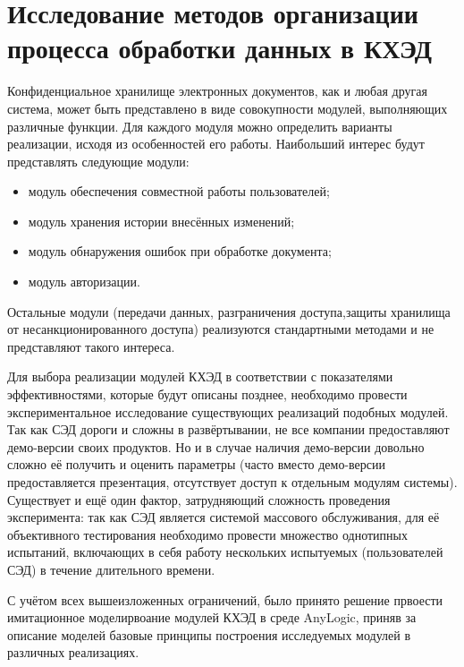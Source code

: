 \section{Исследование методов организации процесса обработки данных в КХЭД} \label{experiment}

Конфиденциальное хранилище электронных документов, как и любая другая система, может быть представлено в виде совокупности модулей, выполняющих различные функции. %
Для каждого модуля можно определить варианты реализации, исходя из особенностей его работы. Наибольший интерес будут представлять следующие модули:
\begin{itemize}
	\item модуль обеспечения совместной работы пользователей;
	\item модуль хранения истории внесённых изменений;
	\item модуль обнаружения ошибок при обработке документа;
	\item модуль авторизации.
\end{itemize}
Остальные модули (передачи данных, разграничения доступа,защиты хранилища от несанкционированного доступа) реализуются стандартными методами и не представляют такого интереса.

\vspace{\baselineskip}
Для выбора реализации модулей КХЭД в соответствии с показателями эффективностями, которые будут описаны позднее, необходимо провести экспериментальное исследование существующих реализаций подобных модулей. Так как СЭД дороги и сложны в развёртывании, не все компании предоставляют демо-версии своих продуктов. Но и в случае наличия демо-версии довольно сложно её получить и оценить параметры (часто вместо демо-версии предоставляется презентация, отсутствует доступ к отдельным модулям системы). Существует и ещё один фактор, затрудняющий сложность проведения эксперимента: так как СЭД является системой массового обслуживания, для её объективного тестирования необходимо провести множество однотипных испытаний, включающих в себя работу нескольких испытуемых (пользователей СЭД) в течение длительного времени.

\vspace{\baselineskip}
С учётом всех вышеизложенных ограничений, было принято решение првоести имитационное моделирвоание модулей КХЭД в среде AnyLogic, приняв за описание моделей базовые принципы построения исследуемых модулей в различных реализациях.

